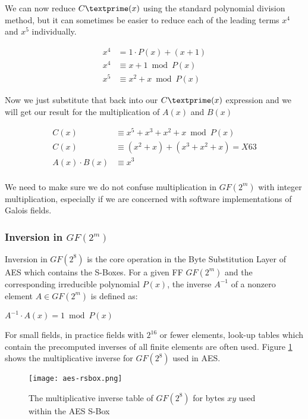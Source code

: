 We can now reduce $C\textprime(x)$ using the standard polynomial division method, but it can sometimes be easier to reduce each of the leading terms $x^4$ and $x^5$ individually.

\begin{center}
\begin{align*}
x^4 &= 1 \cdot P(x) + (x+1)\\
x^4 &\equiv x + 1 \bmod P(x) \\
x^5 &\equiv x^2 + x \bmod P(x)
\end{align*}
\end{center} 

Now we just substitute that back into our $C\textprime(x)$ expression and we will get our result for the multiplication of $A(x)$ and $B(x)$

\begin{center}
\begin{align*}
C(x) &\equiv x^5 + x^3 + x^2 + x \bmod P(x) \\
C(x) &\equiv (x^2 + x) + (x^3 + x^2 + x) = X63 \\
A(x) \cdot B(x) &\equiv x^3 \\
\end{align*}
\end{center}

We need to make sure we do not confuse multiplication in $GF(2^m)$ with integer multiplication, especially if we are concerned with software implementations of Galois fields.

\subsubsection{Inversion in $GF(2^m)$}

Inversion in $GF(2^8)$ is the core operation in the Byte Substitution Layer of AES which contains the S-Boxes. For a given FF $GF(2^m)$ and the corresponding irreducible polynomial $P(x)$, the inverse $A^{-1}$ of a nonzero element $A \in GF(2^m)$ is defined as:

\begin{center}
$A^{-1} \cdot A(x) = 1 \bmod P(x)$
\end{center}

For small fields, in practice fields with $2^16$ or fewer elements, look-up tables which contain the precomputed inverses of all finite elements are often used. Figure \ref{AES-RS-BOX} shows the multiplicative inverse for $GF(2^8)$ used in AES.

\begin{figure}[H]
\begin{center}
\texttt{[image: aes-rsbox.png]}
\caption{The multiplicative inverse table of $GF(2^8)$ for bytes $xy$ used within the AES S-Box}
\label{AES-RS-BOX}
\end{center}
\end{figure}

